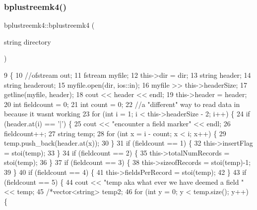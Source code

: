 \subsubsection{\texorpdfstring{bplustreemk4()}{bplustreemk4()}\hspace{0.1cm}{\footnotesize\ttfamily [2/2]}}
{\footnotesize\ttfamily bplustreemk4\+::bplustreemk4 (\begin{DoxyParamCaption}\item[{string}]{directory }\end{DoxyParamCaption})}


\begin{DoxyCode}
9                                      \{
10     \textcolor{comment}{//ofstream out;}
11     fstream myfile;
12     this->dir = dir;
13     \textcolor{keywordtype}{string} header;
14     \textcolor{keywordtype}{string} headerout;
15     myfile.open(dir, ios::in);
16     myfile >> this->headerSize;
17     getline(myfile, header);
18     cout << header << endl;
19     this->header = header;
20     \textcolor{keywordtype}{int} fieldcount = 0;
21     \textcolor{keywordtype}{int} count = 0;
22     \textcolor{comment}{//a "different" way to read data in because it wasnt working}
23     \textcolor{keywordflow}{for} (\textcolor{keywordtype}{int} i = 1; i < this->headerSize - 2; i++) \{
24         \textcolor{keywordflow}{if} (header.at(i) == \textcolor{charliteral}{'|'}) \{
25             cout << \textcolor{stringliteral}{"encounter a field marker"} << endl;
26             fieldcount++;
27             \textcolor{keywordtype}{string} temp;
28             \textcolor{keywordflow}{for} (\textcolor{keywordtype}{int} x = i - count; x < i; x++) \{
29                 temp.push\_back(header.at(x));
30             \}
31             \textcolor{keywordflow}{if} (fieldcount == 1) \{
32                 this->insertFlag = stoi(temp);
33             \}
34             \textcolor{keywordflow}{if} (fieldcount == 2) \{
35                 this->totalNumRecords = stoi(temp);
36             \}
37             \textcolor{keywordflow}{if} (fieldcount == 3) \{
38                 this->sizeofRecords = stoi(temp)-1;
39             \}
40             \textcolor{keywordflow}{if} (fieldcount == 4) \{
41                 this->fieldsPerRecord = stoi(temp);
42             \}
43             \textcolor{keywordflow}{if} (fieldcount == 5) \{
44                 cout << \textcolor{stringliteral}{"temp aka what ever we have deemed a field "} << temp;
45                 \textcolor{comment}{/*vector<string> temp2;}
46 \textcolor{comment}{                for (int y = 0; y < temp.size(); y++) \{}

\end{DoxyCode}
